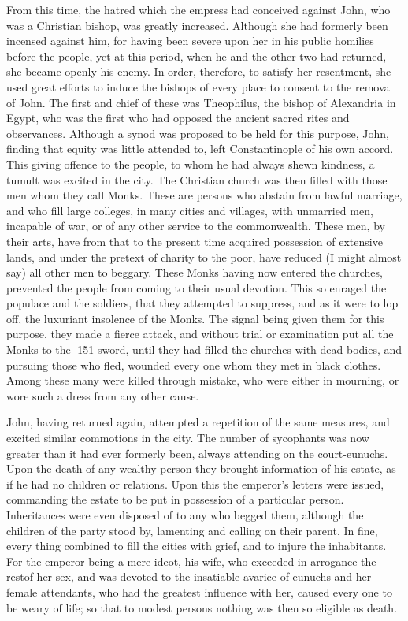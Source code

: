 From this time, the hatred which the empress had conceived against John, who was a Christian bishop, was greatly increased. Although she had formerly been incensed against him, for having been severe upon her in his public homilies before the people, yet at this period, when he and the other two had returned, she became openly his enemy. In order, therefore, to satisfy her resentment, she used great efforts to induce the bishops of every place to consent to the removal of John. The first and chief of these was Theophilus, the bishop of Alexandria in Egypt, who was the first who had opposed the ancient sacred rites and observances. Although a synod was proposed to be held for this purpose, John, finding that equity was little attended to, left Constantinople of his own accord. This giving offence to the people, to whom he had always shewn kindness, a tumult was excited in the city. The Christian church was then filled with those men whom they call Monks. These are persons who abstain from lawful marriage, and who fill large colleges, in many cities and villages, with unmarried men, incapable of war, or of any other service to the commonwealth. These men, by their arts, have from that to the present time acquired possession of extensive lands, and under the pretext of charity to the poor, have reduced (I might almost say) all other men to beggary. These Monks having now entered the churches, prevented the people from coming to their usual devotion. This so enraged the populace and the soldiers, that they attempted to suppress, and as it were to lop off, the luxuriant insolence of the Monks. The signal being given them for this purpose, they made a fierce attack, and without trial or examination put all the Monks to the
|151 sword, until they had filled the churches with dead bodies, and pursuing those who fled, wounded every one whom they met in black clothes. Among these many were killed through mistake, who were either in mourning, or wore such a dress from any other cause.

John, having returned again, attempted a repetition of the same measures, and excited similar commotions in the city. The number of sycophants was now greater than it had ever formerly been, always attending on the court-eunuchs. Upon the death of any wealthy person they brought information of his estate, as if he had no children or relations. Upon this the emperor's letters were issued, commanding the estate to be put in possession of a particular person. Inheritances were even disposed of to any who begged them, although the children of the party stood by, lamenting and calling on their parent. In fine, every thing combined to fill the cities with grief, and to injure the inhabitants. For the emperor being a mere ideot, his wife, who exceeded in arrogance the restof her sex, and was devoted to the insatiable avarice of eunuchs and her female attendants, who had the greatest influence with her, caused every one to be weary of life; so that to modest persons nothing was then so eligible as death.

